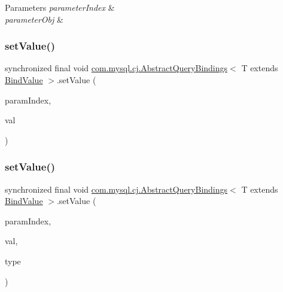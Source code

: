 \begin{DoxyParams}{Parameters}
{\em parameter\+Index} & \\
\hline
{\em parameter\+Obj} & \\
\hline
\end{DoxyParams}
\mbox{\label{classcom_1_1mysql_1_1cj_1_1_abstract_query_bindings_a2baacdf89019d5ad8cadbbec82603991}} 
\subsubsection{\texorpdfstring{set\+Value()}{setValue()}\hspace{0.1cm}{\footnotesize\ttfamily [1/4]}}
{\footnotesize\ttfamily synchronized final void \mbox{\hyperlink{classcom_1_1mysql_1_1cj_1_1_abstract_query_bindings}{com.\+mysql.\+cj.\+Abstract\+Query\+Bindings}}$<$ T extends \mbox{\hyperlink{interfacecom_1_1mysql_1_1cj_1_1_bind_value}{Bind\+Value}} $>$.set\+Value (\begin{DoxyParamCaption}\item[{int}]{param\+Index,  }\item[{byte \mbox{[}$\,$\mbox{]}}]{val }\end{DoxyParamCaption})}

\mbox{\label{classcom_1_1mysql_1_1cj_1_1_abstract_query_bindings_a7d6e6794a12d22bc55d8c5bd33640e3c}} 
\subsubsection{\texorpdfstring{set\+Value()}{setValue()}\hspace{0.1cm}{\footnotesize\ttfamily [2/4]}}
{\footnotesize\ttfamily synchronized final void \mbox{\hyperlink{classcom_1_1mysql_1_1cj_1_1_abstract_query_bindings}{com.\+mysql.\+cj.\+Abstract\+Query\+Bindings}}$<$ T extends \mbox{\hyperlink{interfacecom_1_1mysql_1_1cj_1_1_bind_value}{Bind\+Value}} $>$.set\+Value (\begin{DoxyParamCaption}\item[{int}]{param\+Index,  }\item[{byte \mbox{[}$\,$\mbox{]}}]{val,  }\item[{\mbox{\hyperlink{enumcom_1_1mysql_1_1cj_1_1_mysql_type}{Mysql\+Type}}}]{type }\end{DoxyParamCaption})}

